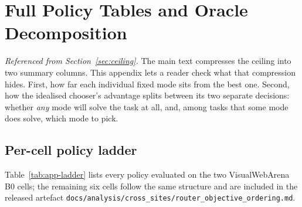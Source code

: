 \chapter{Full Policy Tables and Oracle Decomposition}
\label{app:ceiling}

\emph{Referenced from Section~\ref{sec:ceiling}.} The main text compresses the
ceiling into two summary columns. This appendix lets a reader check what that
compression hides. First, how far each individual fixed mode sits from the
best one. Second, how the idealised chooser's advantage splits between its two
separate decisions: whether \emph{any} mode will solve the task at all, and,
among tasks that some mode does solve, which mode to pick.

\section{Per-cell policy ladder}

Table~\ref{tab:app-ladder} lists every policy evaluated on the two
VisualWebArena B0 cells; the remaining six cells follow the same structure and
are included in the released artefact
\texttt{docs/analysis/cross\_sites/router\_objective\_ordering.md}.

